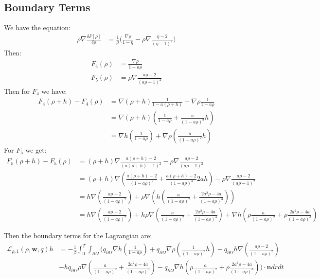 \documentclass[11pt, a4paper]{article}
\theoremstyle{definition}
\newcommand{\w}{\mathbf{w}}
\newcommand{\n}{\mathbf{n}}
\begin{document}
\subsection{Boundary Terms}
We have the equation:
\begin{align*}
	\rho \nabla \frac{\delta F[\rho]}{\delta \rho} &= \frac{1}{\beta} \bigg(  \frac{\nabla \rho}{1 - \eta}  - \rho \nabla\frac{\eta - 2}{(\eta - 1)^2}  \bigg)
\end{align*}
Then:
\begin{align*}
	F_4(\rho) &= \frac{\nabla \rho}{1 - a \rho}\\
	F_5(\rho) &= \rho \nabla\frac{a \rho - 2}{(a \rho - 1)^2}  
\end{align*}
Then for $F_4$ we have:
\begin{align*}
	F_4(\rho+h) - F_4(\rho) &=\nabla (\rho + h) \frac{1}{1 - a (\rho + h)} - \nabla \rho \frac{1}{1 - a \rho}\\
	&= \nabla(\rho + h) \left(\frac{1}{1 - a\rho} + \frac{a}{(1 -a \rho)^2}h \right)\\
	&= \nabla h \left(\frac{1}{1 - a\rho}\right) + \nabla \rho \left( \frac{a}{(1 -a \rho)^2}h \right)
\end{align*}
For $F_5$ we get:
\begin{align*}
	F_5(\rho + h) - F_5(\rho) &= (\rho + h) \nabla\frac{a (\rho +h) - 2}{(a (\rho +h) - 1)^2}  - \rho \nabla\frac{a \rho - 2}{(a \rho - 1)^2} \\
	&=(\rho + h) \nabla \left( \frac{a (\rho +h) - 2}{(1- a \rho)^2} + \frac{a (\rho +h) - 2}{(1- a \rho)^3} 2ah\right) - \rho \nabla\frac{a \rho - 2}{(a \rho - 1)^2} \\
	&= h \nabla \left(\frac{a \rho  - 2}{(1- a \rho)^2}\right) + \rho \nabla \left( h\left( \frac{a}{(1- a \rho)^2} + \frac{2a^2\rho - 4a}{(1- a \rho)^3} \right)\right)\\
	&= h \nabla \left(\frac{a \rho  - 2}{(1- a \rho)^2}\right) + h \rho \nabla \left( \frac{a}{(1- a \rho)^2} + \frac{2a^2\rho - 4a}{(1- a \rho)^3} \right) + \nabla h \left( \rho \frac{a}{(1- a \rho)^2} + \rho\frac{2a^2\rho - 4a}{(1- a \rho)^3} \right)
\end{align*}

Then the boundary terms for the Lagrangian are:
\begin{align*}
	\mathcal{L}_{\rho,1}(\rho,\w, q) h &= - \frac{1}{\beta}\int_0^T \int_{\partial \Omega} \bigg( q_{\partial \Omega}\nabla h \left(\frac{1}{1 - a\rho}\right) + q_{\partial \Omega}\nabla \rho \left( \frac{1}{(1 -a \rho)^2}h \right)- q_{\partial \Omega}h \nabla \left(\frac{a \rho  - 2}{(1- a \rho)^2}\right) \\
	&- h q_{\partial \Omega}\rho \nabla \left( \frac{a}{(1- a \rho)^2} + \frac{2a^2\rho - 4a}{(1- a \rho)^3} \right) - q_{\partial \Omega}\nabla h \left( \rho \frac{a}{(1- a \rho)^2} + \rho\frac{2a^2\rho - 4a}{(1- a \rho)^3} \right) \bigg) \cdot \n dr dt
\end{align*}
\end{document}
